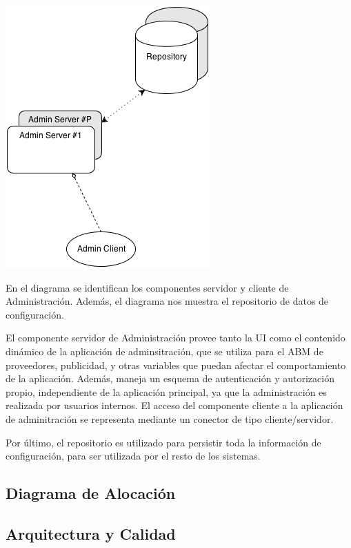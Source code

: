\includegraphics[scale=0.5]{ISW2_cNc_Administracion}

En el diagrama se identifican los componentes servidor y cliente de Administraci\'on. Adem\'as, el diagrama nos muestra el repositorio de datos de configuraci\'on.

El componente servidor de Administraci\'on provee tanto la UI como el contenido din\'amico de la aplicaci\'on de adminsitraci\'on, que se utiliza para el ABM de proveedores, publicidad, y otras variables que puedan afectar el comportamiento de la aplicaci\'on. Adem\'as, maneja un esquema de autenticaci\'on y autorizaci\'on propio, independiente de la aplicaci\'on principal, ya que la administraci\'on es realizada por usuarios internos. El acceso del componente cliente a la aplicaci\'on de adminitraci\'on se representa mediante un conector de tipo cliente/servidor.

Por \'ultimo, el repositorio es utilizado para persistir toda la informaci\'on de configuraci\'on, para ser utilizada por el resto de los sistemas.




\subsection*{Diagrama de Alocaci\'on}




\subsection*{Arquitectura y Calidad}

